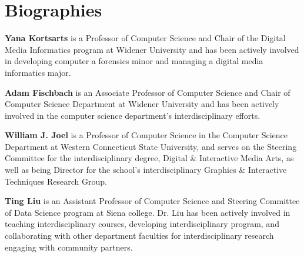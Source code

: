 \documentclass{article}
\begin{document}
\section{Biographies}
\textbf{Yana Kortsarts} is a Professor of Computer Science and Chair of the Digital Media Informatics program at Widener University and has been actively involved in developing computer a forensics minor and managing a digital media informatics major.

\noindent
\textbf{Adam Fischbach} is an Associate Professor of Computer Science and Chair of Computer Science Department at Widener University and has been actively involved in the computer science department's interdisciplinary efforts.

\noindent
\textbf{William J. Joel} is a Professor of Computer Science in the Computer Science Department at Western Connecticut State University, and serves on the Steering Committee for the interdisciplinary degree, Digital \& Interactive Media Arts, as well as being Director for the school's interdisciplinary Graphics \& Interactive Techniques Research Group.

\noindent
\textbf{Ting Liu} is an Assistant Professor of Computer Science and Steering Committee of Data Science program at Siena college. Dr. Liu has been actively involved in teaching interdisciplinary courses, developing interdisciplinary program, and collaborating with other department faculties for interdisciplinary research engaging with community partners.
\end{document}
